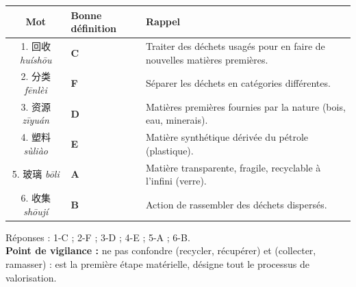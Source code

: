 \documentclass[11pt]{article}
\newcommand{\zh}[1]{\ifmmode\text{#1}\else{#1}\fi}
\begin{document}
\begin{corrige}
\begin{center}
\begin{tabularx}{\linewidth}{|c|X|X|}
\hline
\rowcolor{popblueL} \textbf{Mot} & \textbf{Bonne définition} & \textbf{Rappel} \\ \hline
1. 回收 \emph{huíshōu} & \textbf{C} & Traiter des déchets usagés pour en faire de nouvelles matières premières. \\ \hline
2. 分类 \emph{fēnlèi} & \textbf{F} & Séparer les déchets en catégories différentes. \\ \hline
3. 资源 \emph{zīyuán} & \textbf{D} & Matières premières fournies par la nature (bois, eau, minerais). \\ \hline
4. 塑料 \emph{sùliào} & \textbf{E} & Matière synthétique dérivée du pétrole (plastique). \\ \hline
5. 玻璃 \emph{bōli} & \textbf{A} & Matière transparente, fragile, recyclable à l'infini (verre). \\ \hline
6. 收集 \emph{shōují} & \textbf{B} & Action de rassembler des déchets dispersés. \\ \hline
\end{tabularx}
\end{center}
Réponses : 1-C ; 2-F ; 3-D ; 4-E ; 5-A ; 6-B.\\
\textbf{Point de vigilance :} ne pas confondre \zh{回收} (recycler, récupérer) et \zh{收集} (collecter, ramasser) : \zh{收集} est la première étape matérielle, \zh{回收} désigne tout le processus de valorisation.
\end{corrige}
\end{document}
